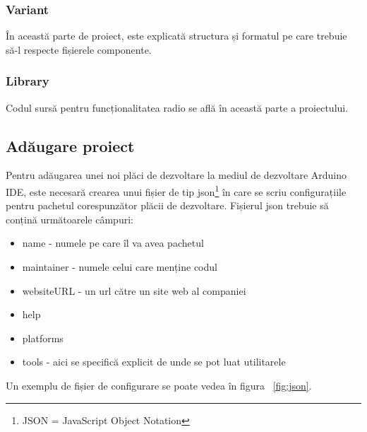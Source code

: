 \documentclass[12pt,a4paper]{report}
\begin{document}
\subsubsection{Variant}
În această parte de proiect, este explicată structura și formatul pe care trebuie să-l respecte fișierele componente.

\subsubsection{Library}
Codul sursă pentru funcționalitatea radio se află în această parte a proiectului.

\subsection{Adăugare proiect}
Pentru adăugarea unei noi plăci de dezvoltare la mediul de dezvoltare Arduino IDE, este necesară crearea unui fișier de tip json\footnote{JSON = JavaScript Object Notation} în care se scriu configurațiile pentru pachetul corespunzător plăcii de dezvoltare.
Fișierul json trebuie să conțină următoarele câmpuri:
\begin{itemize}
	\item{name - numele pe care îl va avea pachetul}
	\item{maintainer - numele celui care menține codul}
	\item{websiteURL - un url către un site web al companiei}
	\item{help}
	\item{platforms}
	\item{tools - aici se specifică explicit de unde se pot luat utilitarele}
\end{itemize}
Un exemplu de fișier de configurare se poate vedea în figura ~\ref{fig:json}.
\end{document}
